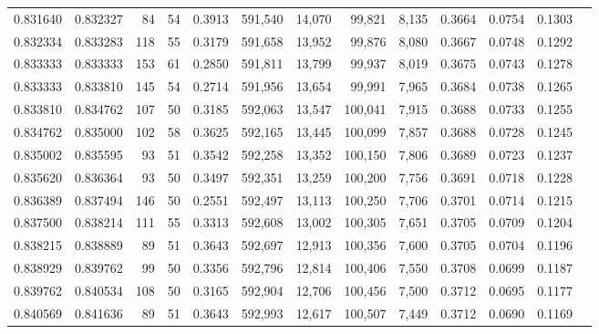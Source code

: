 \begin{tabular}{rrrrrrrrrrrrr}
0.831640 & 0.832327 &     84 &    54 &                                     0.3913 & 591,540 &  14,070 &  99,821 &   8,135 & 0.3664 & 0.0754 & 0.1303 \\
0.832334 & 0.833283 &    118 &    55 &                                     0.3179 & 591,658 &  13,952 &  99,876 &   8,080 & 0.3667 & 0.0748 & 0.1292 \\
0.833333 & 0.833333 &    153 &    61 &                                     0.2850 & 591,811 &  13,799 &  99,937 &   8,019 & 0.3675 & 0.0743 & 0.1278 \\
0.833333 & 0.833810 &    145 &    54 &                                     0.2714 & 591,956 &  13,654 &  99,991 &   7,965 & 0.3684 & 0.0738 & 0.1265 \\
0.833810 & 0.834762 &    107 &    50 &                                     0.3185 & 592,063 &  13,547 & 100,041 &   7,915 & 0.3688 & 0.0733 & 0.1255 \\
0.834762 & 0.835000 &    102 &    58 &                                     0.3625 & 592,165 &  13,445 & 100,099 &   7,857 & 0.3688 & 0.0728 & 0.1245 \\
0.835002 & 0.835595 &     93 &    51 &                                     0.3542 & 592,258 &  13,352 & 100,150 &   7,806 & 0.3689 & 0.0723 & 0.1237 \\
0.835620 & 0.836364 &     93 &    50 &                                     0.3497 & 592,351 &  13,259 & 100,200 &   7,756 & 0.3691 & 0.0718 & 0.1228 \\
0.836389 & 0.837494 &    146 &    50 &                                     0.2551 & 592,497 &  13,113 & 100,250 &   7,706 & 0.3701 & 0.0714 & 0.1215 \\
0.837500 & 0.838214 &    111 &    55 &                                     0.3313 & 592,608 &  13,002 & 100,305 &   7,651 & 0.3705 & 0.0709 & 0.1204 \\
0.838215 & 0.838889 &     89 &    51 &                                     0.3643 & 592,697 &  12,913 & 100,356 &   7,600 & 0.3705 & 0.0704 & 0.1196 \\
0.838929 & 0.839762 &     99 &    50 &                                     0.3356 & 592,796 &  12,814 & 100,406 &   7,550 & 0.3708 & 0.0699 & 0.1187 \\
0.839762 & 0.840534 &    108 &    50 &                                     0.3165 & 592,904 &  12,706 & 100,456 &   7,500 & 0.3712 & 0.0695 & 0.1177 \\
0.840569 & 0.841636 &     89 &    51 &                                     0.3643 & 592,993 &  12,617 & 100,507 &   7,449 & 0.3712 & 0.0690 & 0.1169 \\

\end{tabular}
